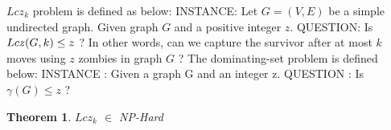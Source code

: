 \documentclass[1p]{elsarticle}
\newtheorem{theorem}{Theorem}
\newcommand{\zn}{\ooalign{$z$\cr\hfil\rule[.5ex]{.2em}{.08ex}\hfil\cr}}
\begin{document}
	$Lcz_k$ problem is defined as below:
	{\newline}
	INSTANCE: Let $G = (V,E)$ be a simple undirected graph. Given graph $G$ and a positive integer $z$.
	{\newline}
	QUESTION: Is $Lc\zn(G,k) \leq z$ ? In other words, can we capture the survivor after at most $k$ moves using $z$ zombies in graph $G$ ?
	{\newline}
	{\newline}
	The dominating-set problem is defined below:
	{\newline}
	INSTANCE : Given a graph G and an integer z.
	{\newline}
	QUESTION : Is $\gamma(G) \leq z$ ?

	\begin{theorem}
		$Lcz_k$ $\in$ NP-Hard
	\end{theorem}
\end{document}

